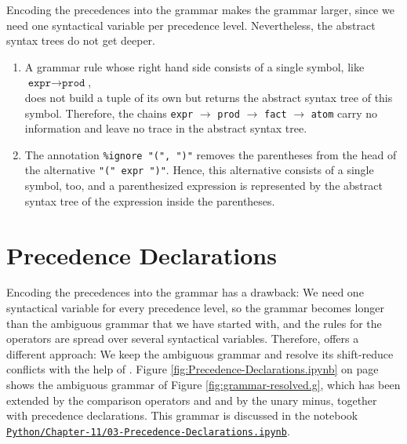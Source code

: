 \remarkEng\label{remark:tree-shape}
Encoding the precedences into the grammar makes the grammar larger, since we need one syntactical variable per
precedence level.  Nevertheless, the abstract syntax trees do not get deeper.
\begin{enumerate}
\item A grammar rule whose right hand side consists of a single symbol, like 
      \\[0.2cm]
      \hspace*{1.3cm}
      $\texttt{expr} \rightarrow \texttt{prod}$,
      \\[0.2cm]
      does not build a tuple of its own but returns the abstract syntax tree of this symbol.
      Therefore, the chains \texttt{expr}
      $\rightarrow$ \texttt{prod} $\rightarrow$ \texttt{fact} $\rightarrow$ \texttt{atom} carry no
      information and leave no trace in the abstract syntax tree.
\item The annotation \texttt{\%ignore "(", ")"} removes the parentheses from the head of the alternative
      \texttt{"(" expr ")"}.  Hence, this alternative consists of a single symbol, too, and a parenthesized
      expression is represented by the abstract syntax tree of the expression inside the parentheses.
\end{enumerate}
\eox

\section{Precedence Declarations \label{section:precedence-declarations}}
Encoding the precedences into the grammar has a drawback:  We need one syntactical variable for every precedence
level, so the grammar becomes longer than the ambiguous grammar that we have started with, and the rules for the
operators are spread over several syntactical variables.  Therefore,  offers a different
approach:  We keep the ambiguous grammar and resolve its shift-reduce conflicts with the help of
.  Figure
\ref{fig:Precedence-Declarations.ipynb} on page \pageref{fig:Precedence-Declarations.ipynb} shows the ambiguous
grammar of Figure \ref{fig:grammar-resolved.g}, which has been extended by the comparison operators \saquoted{<}
and \saquoted{==} and by the unary minus, together with precedence declarations.  This grammar is discussed in the
notebook
\\[0.2cm]
\hspace*{1.3cm}
\href{https://github.com/karlstroetmann/Formal-Languages/blob/master/Python/Chapter-11/03-Precedence-Declarations.ipynb}{\texttt{Python/Chapter-11/03-Precedence-Declarations.ipynb}}.

